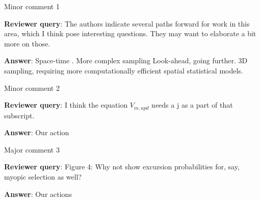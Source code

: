 \documentclass[a4paper]{article}
\def\reply{\textbf{Reviewer query}}
\def\action{\textbf{Answer}}
\begin{document}
\begin{answers}

\item{Minor comment 1}\label{r3c1}

\reply: The authors indicate several paths forward for work in this area, which I think pose interesting questions. They may want to elaborate a bit more on those.

\action: Space-time \cite{sigrist2015stochastic,richardson2017sparsity}. More complex sampling Look-ahead, going further. 3D sampling, requiring more computationally efficient spatial statistical models. 

\item{Minor comment 2}\label{r3c2}

\reply: I think the equation $V_{m,upd}$ needs a j as a part of that subscript.

\action: Our action

\item{Major comment 3}\label{r3c3}

\reply: Figure 4: Why not show excursion probabilities for, say, myopic selection as well?

\action: Our actions

\end{answers}


\footnotesize



\end{document}
